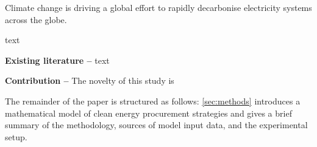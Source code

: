 Climate change is driving a global effort to rapidly decarbonise electricity systems across the globe.

text


\textbf{Existing literature --}
text


\textbf{Contribution --} The novelty of this study is


The remainder of the paper is structured as follows: \cref{sec:methods} introduces a mathematical model of clean energy procurement strategies and gives a brief summary of the methodology, sources of model input data, and the experimental setup.
